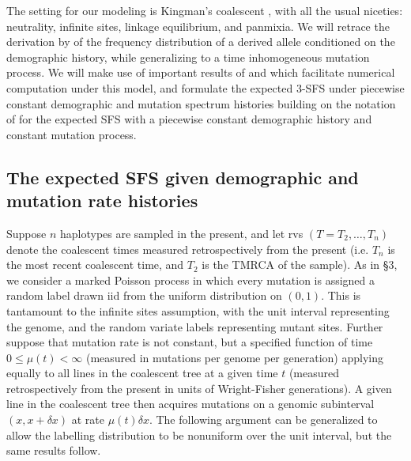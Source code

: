 \documentclass[11pt]{article}
\begin{document}
The setting for our modeling is Kingman's coalescent \citep{Kingman1982-ge, Kingman1982-tf, Kingman1982-ys, Kingman2000-jr}, with all the usual niceties: neutrality, infinite sites, linkage equilibrium, and panmixia.
We will retrace the derivation by \cite{Griffiths1998-qf} of the frequency distribution of a derived allele conditioned on the demographic history, while generalizing to a time inhomogeneous mutation process.
We will make use of important results of \cite{Polanski2003-kg} and \cite{Polanski2003-ll} which facilitate numerical computation under this model, and formulate the expected 3-SFS under piecewise constant demographic and mutation spectrum histories building on the notation of \cite{Rosen2018-bb} for the expected SFS with a piecewise constant demographic history and constant mutation process.

\subsection{The expected SFS given demographic and mutation rate histories}\label{sec:model:xi}

Suppose $n$ haplotypes are sampled in the present, and let rvs $(T = T_2,\dots,T_n)$ denote the coalescent times measured retrospectively from the present (i.e. $T_n$ is the most recent coalescent time, and $T_2$ is the TMRCA of the sample).
As in \cite{Griffiths1998-qf} \S3, we consider a marked Poisson process in which every mutation is assigned a random label drawn iid from the uniform distribution on $(0,1)$.
This is tantamount to the infinite sites assumption, with the unit interval representing the genome, and the random variate labels representing mutant sites.
Further suppose that mutation rate is not constant, but a specified function of time $0\le \mu(t)<\infty$ (measured in mutations per genome per generation) applying equally to all lines in the coalescent tree at a given time $t$ (measured retrospectively from the present in units of Wright-Fisher generations).
A given line in the coalescent tree then acquires mutations on a genomic subinterval $(x,x+\delta x)$ at rate $\mu(t)\delta x$.
The following argument can be generalized to allow the labelling distribution to be nonuniform over the unit interval, but the same results follow.
\end{document}
